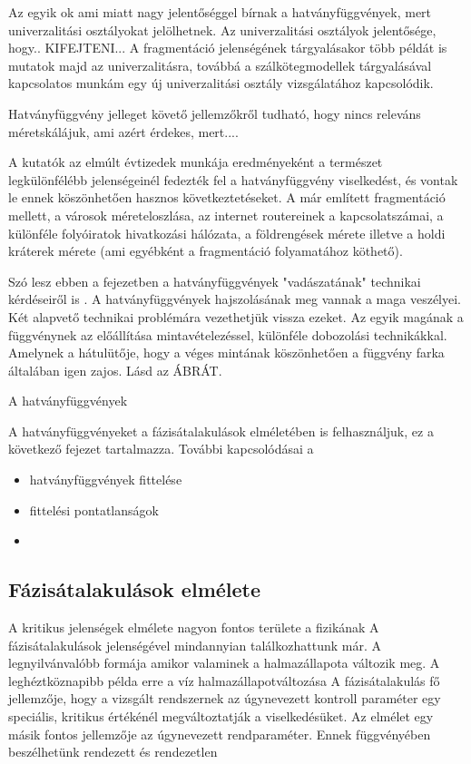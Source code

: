 	Az egyik ok ami miatt nagy jelentőséggel bírnak a hatványfüggvények, mert univerzalitási osztályokat jelölhetnek. Az univerzalitási osztályok jelentősége, hogy.. KIFEJTENI... A fragmentáció jelenségének tárgyalásakor több példát is mutatok majd az univerzalitásra, továbbá a szálkötegmodellek tárgyalásával kapcsolatos munkám egy új univerzalitási osztály vizsgálatához kapcsolódik. 
	
	Hatványfüggvény jelleget követő jellemzőkről tudható, hogy nincs releváns méretskálájuk, ami azért érdekes, mert....
	
	A kutatók az elmúlt évtizedek munkája eredményeként a természet legkülönfélébb jelenségeinél fedezték fel a hatványfüggvény viselkedést, és vontak le ennek köszönhetően hasznos következtetéseket. A már említett fragmentáció mellett, a városok méreteloszlása, az internet routereinek a kapcsolatszámai, a különféle folyóiratok hivatkozási hálózata, a földrengések mérete illetve a holdi kráterek mérete (ami egyébként a fragmentáció folyamatához köthető).
	
	Szó lesz ebben a fejezetben a hatványfüggvények "vadászatának" technikai kérdéseiről is \cite{}. 
	A hatványfüggvények hajszolásának meg vannak a maga veszélyei. Két alapvető technikai problémára vezethetjük vissza ezeket. Az egyik magának a függvénynek az előállítása mintavételezéssel, különféle dobozolási technikákkal. Amelynek a hátulütője, hogy a véges mintának köszönhetően a függvény farka általában igen zajos. Lásd az ÁBRÁT. 
	
	A hatványfüggvények 
	
	A hatványfüggvényeket a fázisátalakulások elméletében is felhasználjuk, ez a következő fejezet tartalmazza. További kapcsolódásai a 
	
	\begin{itemize}
		\item hatványfüggvények fittelése
		\item fittelési pontatlanságok
		\item 
	\end{itemize}
	\subsection{Fázisátalakulások elmélete}
		A kritikus jelenségek elmélete nagyon fontos területe a fizikának
		A fázisátalakulások jelenségével mindannyian találkozhattunk már. A legnyilvánvalóbb formája amikor valaminek a halmazállapota változik meg. A leghéztköznapibb példa erre a víz halmazállapotváltozása
		A fázisátalakulás fő jellemzője, hogy a vizsgált rendszernek az úgynevezett kontroll paraméter egy speciális, kritikus értékénél megváltoztatják a viselkedésüket. Az elmélet egy másik fontos jellemzője az úgynevezett rendparaméter. Ennek függvényében beszélhetünk rendezett és rendezetlen 

